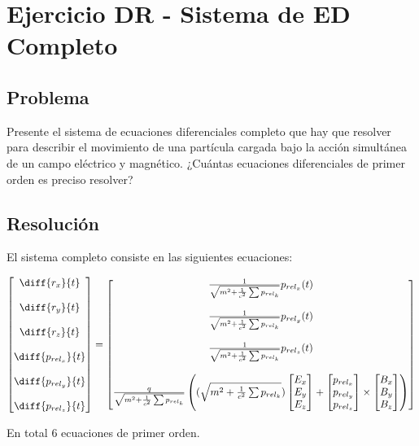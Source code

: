 \section{Ejercicio DR - Sistema de ED Completo}

\subsection{Problema}
Presente el sistema de ecuaciones diferenciales completo que hay que resolver para describir el movimiento de una partícula cargada bajo la acción simultánea de un campo eléctrico y magnético. ¿Cuántas ecuaciones diferenciales de primer orden es preciso resolver?

\subsection{Resolución}

El sistema completo consiste en las siguientes ecuaciones:

\begin{equation*} 
	\begin{bmatrix} 
	\diff{r_x}{t} \\ \\
	\diff{r_y}{t} \\ \\ 
	\diff{r_z}{t} \\ \\
	\diff{p_{rel_x}}{t} \\ \\
	\diff{p_{rel_y}}{t} \\ \\ 
	\diff{p_{rel_z}}{t} 
\end{bmatrix} = 
\begin{bmatrix}
	\frac{1}{\sqrt{ 
			m^2 + \frac{1}{c^2} \sum p_{rel_k}	
	}} p_{rel_x}(t) \\ \\ \frac{1}{\sqrt{ 
	m^2 + \frac{1}{c^2} \sum p_{rel_k}	
}} p_{rel_y}(t) \\ \\ \frac{1}{\sqrt{ 
m^2 + \frac{1}{c^2} \sum p_{rel_k}	
}} p_{rel_z}(t)
\\ \\
		\frac{q}{\sqrt{ 
			m^2 + \frac{1}{c^2} \sum p_{rel_k}	
	}} \left( 
	(\sqrt{ 
		m^2 + \frac{1}{c^2} \sum p_{rel_k}	
	})\begin{bmatrix} 
		E_x \\ E_y \\ E_z 
	\end{bmatrix} + 
	\begin{bmatrix} 
		p_{rel_x} \\ p_{rel_y} \\ p_{rel_z}
	\end{bmatrix} 
	\times 
	\begin{bmatrix} B_x \\ B_y \\ B_z \end{bmatrix} 
	\right)
\end{bmatrix} 
\end{equation*}

En total 6 ecuaciones de primer orden.